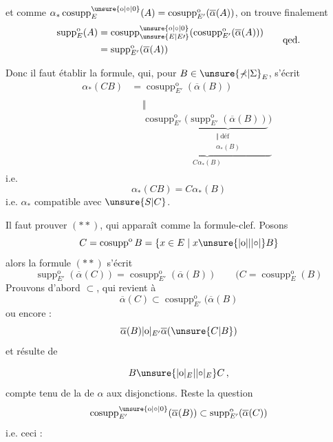
et comme $\alpha_*\operatorname{cosupp}^{\unsure{\mathrm{o}|\circ|0}}_E(A)=\operatorname{cosupp}^{\mathrm{o}}_{E'}(\overline\alpha(A))$, on trouve finalement
\[
\begin{aligned}
\operatorname{supp}^{\mathrm{o}}_E(A)&=\operatorname{cosupp}^{\unsure{\mathrm{o}|\circ|0}}_{\unsure{E|E\prime}}(\operatorname{cosupp}^{\mathrm{o}}_{E'}(\overline\alpha(A)))\\
&=\operatorname{supp}^{\mathrm{o}}_{E'}(\overline\alpha(A))
\end{aligned}
\qquad\text{qed.}
\]

Donc il faut établir la formule, qui, pour $B\in\unsure{\mathbb\Sigma|\Sigma}_E$,  s'écrit
\[
\begin{aligned}
\alpha_*(CB)&=\operatorname{cosupp}^{\mathrm{o}}_{E'}(\overline\alpha(B))\\
&\begin{aligned}&\Vert\\
&\underbrace{\operatorname{cosupp}^{\mathrm{o}}_{E'}\bigl(\underbrace{\operatorname{supp}^{\mathrm{o}}_{E'}(\overline\alpha(B))}_{\substack{\Vert\ \text{déf}\\\alpha_*(B)}}\bigr)}_{C\alpha_*(B)}
\end{aligned}
\end{aligned}
\]
i.e.
\[
\boxed{\alpha_*(CB)=C\alpha_*(B)}
\]
i.e. $\alpha_*$ compatible avec $\unsure{S|C}$.

 Il faut  prouver $(**)$, qui apparaît comme la formule-clef.
Posons
\[
C=\operatorname{cosupp}^{\mathrm{o}}B=\{x\in E\mid x\unsure{|\mathrm{o}||\lvert\circ\rvert}B\}
\]
alors la formule $(**)$ s'écrit
\[
\operatorname{supp}^{\mathrm{o}}_{E'}(\overline\alpha(C))=\operatorname{cosupp}^{\mathrm{o}}_{E'}(\overline\alpha(B))
\qquad(C=\operatorname{cosupp}^{\mathrm{o}}_E(B)
\]
Prouvons d'abord $\subset$, qui revient à
\[
\overline\alpha(C)\subset\operatorname{cosupp}^{\mathrm{o}}_{E'}(\overline\alpha(B)
\]
ou encore :
\[
\overline\alpha(B)|\mathrm{o}|_{E'}\overline\alpha(\unsure{C|B})
\]
et résulte de 


\[
B\unsure{|\mathrm{o}|_E|\lvert\circ\rvert_E}C\,,
\]
compte tenu de la  de $\alpha$ aux disjonctions.
Reste la question
\[
\operatorname{cosupp}^{\unsure{\mathrm{o}|\circ|0}}_{E'}(\overline\alpha(B))\subset\operatorname{supp}^{\mathrm{o}}_{E'}(\overline\alpha(C))
\]
i.e. ceci :

